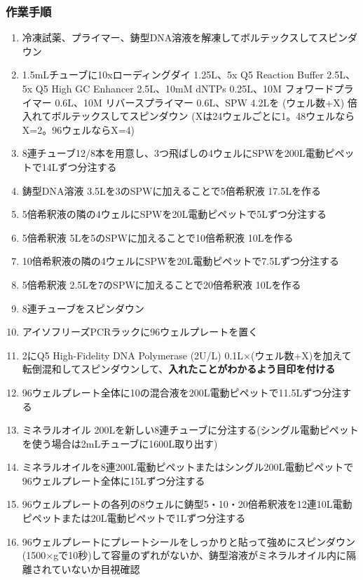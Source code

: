 \documentclass[titlepage,10pt,a4paper,uplatex]{jsbook}
\renewcommand{\textbf}[1]{{\bfseries\sffamily#1}}
\begin{document}
\subsubsection{作業手順}
\begin{enumerate}
\item 冷凍試薬、プライマー、鋳型DNA溶液を解凍してボルテックスしてスピンダウン
\item 1.5mLチューブに10xローディングダイ 1.25{\textmu}L、5x Q5 Reaction Buffer 2.5{\textmu}L、5x Q5 High GC Enhancer 2.5{\textmu}L、10mM dNTPs 0.25{\textmu}L、10{\textmu}M フォワードプライマー 0.6{\textmu}L、10{\textmu}M リバースプライマー 0.6{\textmu}L、SPW 4.2{\textmu}Lを (ウェル数+X) 倍入れてボルテックスしてスピンダウン (Xは24ウェルごとに1。48ウェルならX=2。96ウェルならX=4)
\item 8連チューブ12/8本を用意し、3つ飛ばしの4ウェルにSPWを200{\textmu}L電動ピペットで14{\textmu}Lずつ分注する
\item 鋳型DNA溶液 3.5{\textmu}Lを3のSPWに加えることで5倍希釈液 17.5{\textmu}Lを作る
\item 5倍希釈液の隣の4ウェルにSPWを20{\textmu}L電動ピペットで5{\textmu}Lずつ分注する
\item 5倍希釈液 5{\textmu}Lを5のSPWに加えることで10倍希釈液 10{\textmu}Lを作る
\item 10倍希釈液の隣の4ウェルにSPWを20{\textmu}L電動ピペットで7.5{\textmu}Lずつ分注する
\item 5倍希釈液 2.5{\textmu}Lを7のSPWに加えることで20倍希釈液 10{\textmu}Lを作る
\item 8連チューブをスピンダウン
\item アイソフリーズPCRラックに96ウェルプレートを置く
\item 2にQ5 High-Fidelity DNA Polymerase (2U/{\textmu}L) 0.1{\textmu}L×(ウェル数+X)を加えて転倒混和してスピンダウンして、\textbf{入れたことがわかるよう目印を付ける}
\item 96ウェルプレート全体に10の混合液を200{\textmu}L電動ピペットで11.5{\textmu}Lずつ分注する
\item ミネラルオイル 200{\textmu}Lを新しい8連チューブに分注する(シングル電動ピペットを使う場合は2mLチューブに1600{\textmu}L取り出す)
\item ミネラルオイルを8連200{\textmu}L電動ピペットまたはシングル200{\textmu}L電動ピペットで96ウェルプレート全体に15{\textmu}Lずつ分注する
\item 96ウェルプレートの各列の8ウェルに鋳型5・10・20倍希釈液を12連10{\textmu}L電動ピペットまたは20{\textmu}L電動ピペットで1{\textmu}Lずつ分注する
\item 96ウェルプレートにプレートシールをしっかりと貼って強めにスピンダウン(1500×gで10秒)して容量のずれがないか、鋳型溶液がミネラルオイル内に隔離されていないか目視確認

\end{enumerate}
\end{document}
